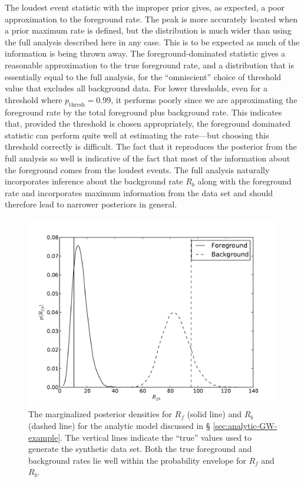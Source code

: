 \documentclass[aps,prd,reprint,nofootinbib]{revtex4-1}
\begin{document}
The loudest event statistic with the improper prior gives, as
expected, a poor approximation to the foreground rate. The peak is
more accurately located when a prior maximum rate is defined, but the
distribution is much wider than using the full analysis described here
in any case. This is to be expected as much of the information is
being thrown away. The foreground-dominated statistic gives a
reasonable approximation to the true foreground rate, and a
distribution that is essentially equal to the full analysis, for the
``omniscient'' choice of threshold value that excludes all background
data. For lower thresholds, even for a threshold where
$p_\mathrm{thresh} = 0.99$, it performs poorly since we are
approximating the foreground rate by the total foreground plus
background rate.  This indicates that, provided the threshold is
chosen appropriately, the foreground dominated statistic can perform
quite well at estimating the rate---but choosing this threshold
correctly is difficult. The fact that it reproduces the posterior from
the full analysis so well is indicative of the fact that most of the
information about the foreground comes from the loudest events. The
full analysis naturally incorporates inference about the background
rate $R_b$ along with the foreground rate and incorporates maximum
information from the data set and should therefore lead to narrower
posteriors in general.

\begin{figure}
  \includegraphics[width=\columnwidth]{rates}
  \caption{\label{fig:analytic-rate-recovery} The marginalized
    posterior densities for $R_f$ (solid line) and $R_b$ (dashed line)
    for the analytic model discussed in \S
    \ref{sec:analytic-GW-example}.  The vertical lines indicate the
    ``true'' values used to generate the synthetic data set.  Both the
    true foreground and background rates lie well within the
    probability envelope for $R_f$ and $R_b$.}
\end{figure}
\end{document}
